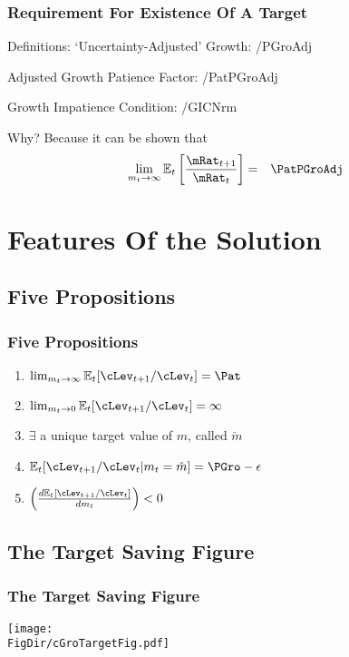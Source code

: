 \documentclass[pdflatex]{beamer}\providecommand{\texname}{BufferStockTheory-Slides}%
\providecommand{\Ex}{\mathbb{E}}
\begin{document}
\begin{frame}
\frametitle{Requirement For Existence Of A Target}

Definitions: `Uncertainty-Adjusted' Growth:
 \LtxDir\EqDir/PGroAdj

Adjusted Growth Patience Factor:
 \LtxDir\EqDir/PatPGroAdj

Growth Impatience Condition:
 \LtxDir\EqDir/GICNrm~



Why?  Because it can be shown that
\begin{eqnarray}
 \lim_{m_{t} \rightarrow \infty} \Ex_{t}\left[\frac{\mRat_{t+1}}{\mRat_{t}}\right] & = & \PatPGroAdj  \label{eq:mGrowth}
\end{eqnarray}

\end{frame}

\section{Features Of the Solution}
\subsection{Five Propositions}
\begin{frame}
\frametitle{Five Propositions}

\begin{enumerate}
\item $\lim_{m_{t} \rightarrow \infty} \Ex_{t}[\cLev_{t+1}/\cLev_{t}] = \Pat$
\item $\lim_{m_{t} \rightarrow 0} \Ex_{t}[\cLev_{t+1}/\cLev_{t}] = \infty$
\item $\exists$ a unique target value of $m$, called $\check{m}$
\item $\Ex_{t}[\cLev_{t+1}/\cLev_{t} | m_{t} = \check{m}] = \PGro - \epsilon$
\item $\left(\frac{d \Ex_{t}[\cLev_{t+1}/\cLev_{t}]}{d m_{t}}\right) < 0$
\end{enumerate}

\end{frame}

\subsection{The Target Saving Figure}
\begin{frame}
\frametitle{The Target Saving Figure}
\centerline{\texttt{[image: \\FigDir/cGroTargetFig.pdf]}}
\end{frame}
\end{document}
